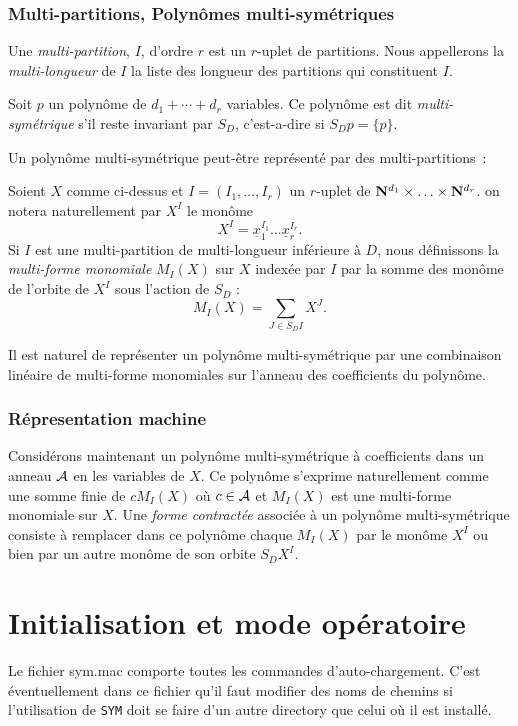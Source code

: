 \documentclass[11pt]{article}
\begin{document}
\subsubsection*{Multi-partitions, Polyn\^omes multi-sym\'etriques}

Une {\it multi-partition}, $I$, d'ordre $r$ est un $r$-uplet de partitions.
Nous appellerons la {\it multi-longueur} de $I$ la liste des longueur
des partitions qui constituent $I$.

Soit $p$ un polyn\^ome de $d_1+\cdots + d_r$ variables. Ce polyn\^ome
est dit {\it multi-sym\'etrique} s'il reste invariant par $S_D$,
c'est-a-dire si $S_D p =\{p\}$.

Un polyn\^ome multi-sym\'etrique peut-\^etre repr\'esent\'e par des
multi-partitions~:

Soient $X$ comme ci-dessus et $I=(I_1,\ldots,I_r)$ un 
$r$-uplet de ${\bf N}^{d_1}\times \ldots \times {\bf N}^{d_r}$.
on notera naturellement par $X^I$ le mon\^ome 
$$
X^I = {\underline x}_1^{I_1}\ldots{\underline
x}_r^{I_r}. 
$$
Si $I$ est une multi-partition de multi-longueur inf\'erieure \`a $D$,
nous d\'efinissons la
{\it multi-forme monomiale} $M_I(X)$ sur $X$ 
index\'ee par $I$ par la somme des mon\^ome de l'orbite de
$X^I$ sous l'action de $S_D$ :
$$
M_I(X) =\sum_{J \in S_DI} X^J.
$$

Il est naturel de repr\'esenter un polyn\^ome multi-sym\'etrique par une
combinaison lin\'eaire de multi-forme monomiales sur l'anneau des
coefficients du polyn\^ome.
\subsubsection*{R\'epresentation machine}
Consid\'erons maintenant un polyn\^ome multi-sym\'etrique \`a
coefficients dans un anneau $\cal A$ en les variables de $X$. 
Ce polyn\^ome s'exprime naturellement comme
une somme finie de $cM_I(X)$ o\`u $c \in {\cal A}$ et $M_I(X)$ est une
multi-forme monomiale sur $X$. Une {\it forme contract\'ee}
associ\'ee \`a un polyn\^ome multi-sym\'etrique
consiste \`a remplacer dans ce polyn\^ome chaque $M_I(X)$ par le mon\^ome 
$X^I$ ou bien par un autre mon\^ome de son orbite $S_DX^I$.

\section{Initialisation et mode op\'eratoire}

Le fichier sym.mac comporte toutes les commandes d'auto-chargement. C'est
\'eventuellement dans ce fichier qu'il faut modifier des noms de chemins si
l'utilisation de {\tt SYM} doit se faire d'un autre directory que celui
o\`u il est install\'e.
\end{document}
